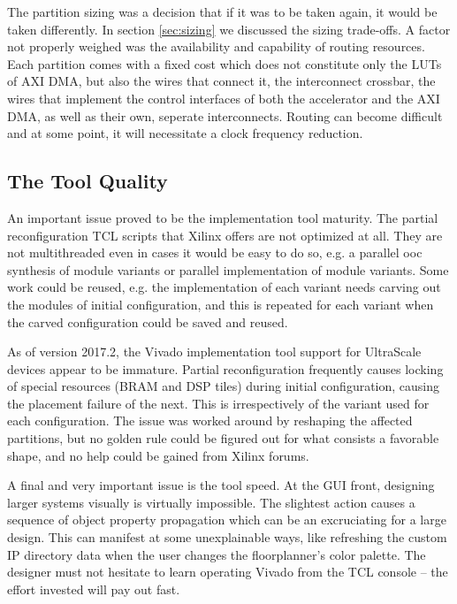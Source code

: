 The partition sizing was a decision that if it was to be taken again, it would be taken differently.
In section \ref{sec:sizing} we discussed the sizing trade-offs. A factor not properly weighed was the
availability and capability of routing resources. Each partition comes with a fixed cost which does
not constitute only the LUTs of AXI DMA, but also the wires that connect it, the interconnect crossbar,
the wires that implement the control interfaces of both the accelerator and the AXI DMA, as well as their own,
seperate interconnects. Routing can become difficult and at some point, it will necessitate a clock frequency reduction.

\subsection{The Tool Quality}

An important issue proved to be the implementation tool maturity. The partial reconfiguration TCL scripts that Xilinx offers
are not optimized at all. They are not multithreaded even in cases it would be easy to do so, e.g. a parallel \gls{ooc} synthesis
of module variants or parallel implementation of module variants. Some work could be reused, e.g.
the implementation of each variant needs carving out the modules of initial configuration,
and this is repeated for each variant when the carved configuration could be saved and reused. 

As of version 2017.2,
the Vivado implementation tool support for UltraScale devices appear to be immature. Partial reconfiguration frequently
causes locking of special resources (BRAM and DSP tiles) during initial configuration, causing the placement failure of the next.
This is irrespectively of the variant used for each configuration. The issue was worked around by reshaping the affected partitions,
but no golden rule could be figured out for what consists a favorable shape, and no help could be gained from Xilinx forums.

A final and very important issue is the tool speed. At the GUI front, designing larger systems visually is virtually impossible.
The slightest action causes a sequence of object property propagation which can be an excruciating for a large design.
This can manifest at some unexplainable ways, like refreshing the custom IP directory data when the user changes the floorplanner's color palette.
The designer must not hesitate to learn operating Vivado from the TCL console -- the effort invested will pay out fast.


